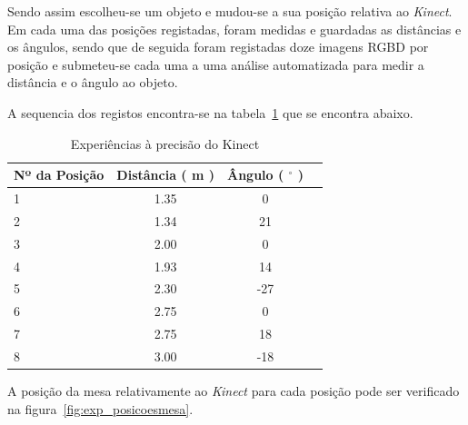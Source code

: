 Sendo assim escolheu-se um objeto e mudou-se a sua posição relativa ao \emph{Kinect}. Em cada uma das posições registadas, foram medidas e guardadas as distâncias e os ângulos, sendo que de seguida foram registadas doze imagens RGBD por posição e submeteu-se cada uma a uma análise automatizada para medir a distância e o ângulo ao objeto.

A sequencia dos registos encontra-se na tabela~\ref{res:dist_analise} que se encontra abaixo.

\begin{table}[htb]
	\begin{center}
		\begin{tabular} { l c c c}
			Nº da Posição & Distância ( m ) & Ângulo ( $^\circ$ ) \\
			\hline
			1 & 1.35 & 0 \\
			2 &  1.34 & 21\\
			3 & 2.00 & 0 \\
			4 & 1.93 & 14 \\
			5 & 2.30 & -27\\
			6 & 2.75 & 0 \\
			7 & 2.75 & 18 \\
			8 & 3.00 & -18 \\
			\hline
		\end{tabular}
		\caption{Experiências à precisão do Kinect}
		\label{res:dist_analise}
	\end{center}
\end{table}

A posição da mesa relativamente ao \emph{Kinect} para cada posição pode ser verificado na figura~\ref{fig:exp_posicoesmesa}.

